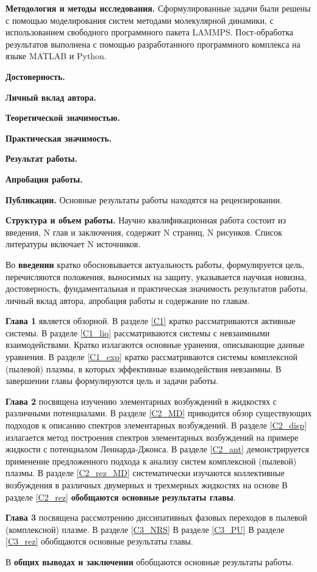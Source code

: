 \textbf{Методология и методы исследования.} 
Сформулированные задачи были решены с помощью моделирования систем методами молекулярной динамики, с использованием свободного программного пакета LAMMPS. Пост-обработка результатов выполнена с помощью разработанного программного комплекса на языке MATLAB и Python.


\textbf{Достоверность.} 

\textbf{Личный вклад автора.}

\textbf{Теоретической значимостью.} 

\textbf{Практическая значимость.} 

\textbf{Результат работы.} 

\textbf{Апробация работы.} 

\textbf{Публикации.} 
Основные результаты работы находятся на рецензировании.

\textbf{Структура и объем работы.} 
Научно квалификационная работа состоит из введения, N глав и заключения, содержит N страниц, N рисунков.
Список литературы включает N источников.

Во \textbf{введении} кратко обосновывается актуальность работы, формулируется цель, перечисляются положения, выносимых на защиту, указывается научная новизна, достоверность, фундаментальная и практическая значимость результатов работы, личный вклад автора, апробация работы и содержание по главам.


\textbf{Глава 1} является обзорной.
В разделе \ref{C1} кратко рассматриваются активные системы.
В разделе \ref{C1_liq} рассматриваются системы с невзаимными взаимодействами. Кратко излагаются основные уранения, описывающие данные уравнения.
В разделе \ref{C1_exp} кратко рассматриваются системы комплексной (пылевой) плазмы, в которых эффективные взаимодействия невзаимны. В завершении главы формулируются цель и задачи работы.


\textbf{Глава 2} посвящена изучению элементарных возбуждений в жидкостях с различными потенциалами.
В разделе \ref{C2_MD} приводится обзор существующих подходов к описанию спектров элементарных возбуждений.
В разделе \ref{C2_disp} излагается метод построения спектров элементарных возбуждений на примере жидкости с потенциалом Леннарда-Джонса.
В разделе \ref{C2_ant} демонстрируется применение предложенного подхода к анализу систем комплексной (пылевой) плазмы.
В разделе \ref{C2_rez_MD} систематически изучаются коллективные возбуждения в различных двумерных и трехмерных жидкостях на основе 
В разделе \ref{C2_rez} \textbf{обобщаются основные результаты главы}.

\textbf{Глава 3} посвящена рассмотрению диссипативных фазовых переходов в пылевой (комплексной) плазме.
В разделе \ref{C3_NRS} 
В разделе \ref{C3_PU} 
В разделе \ref{C3_rez} обобщаются основные результаты главы.

В \textbf{общих выводах и заключении} обобщаются основные результаты работы.
